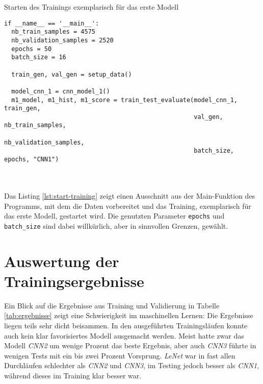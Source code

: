 \begin{listing} [ht]
	\caption{Starten des Trainings exemplarisch für das erste Modell}
	\label{lst:start-training}
	\begin{verbatim}
if __name__ == '__main__':
  nb_train_samples = 4575
  nb_validation_samples = 2520
  epochs = 50
  batch_size = 16

  train_gen, val_gen = setup_data()

  model_cnn_1 = cnn_model_1()
  m1_model, m1_hist, m1_score = train_test_evaluate(model_cnn_1, train_gen,
                                                    val_gen, nb_train_samples,
                                                    nb_validation_samples,
                                                    batch_size, epochs, "CNN1")
	\end{verbatim}
\end{listing} \ \\
\\
Das Listing \ref{lst:start-training} zeigt einen Ausschnitt aus der Main-Funktion des Programms, mit dem die Daten vorbereitet und das Training, exemplarisch für das erste Modell, gestartet wird. Die genutzten Parameter \texttt{epochs} und \texttt{batch\_size} sind dabei willkürlich, aber in sinnvollen Grenzen, gewählt.

\section{Auswertung der Trainingsergebnisse}
Ein Blick auf die Ergebnisse aus Training und Validierung in Tabelle \ref{tab:ergebnisse} zeigt eine Schwierigkeit im maschinellen Lernen: Die Ergebnisse liegen teils sehr dicht beisammen. In den ausgeführten Trainingsläufen konnte auch kein klar favorisiertes Modell ausgemacht werden. Meist hatte zwar das Modell \textit{CNN2} um wenige Prozent das beste Ergebnis, aber auch \textit{CNN3} führte in wenigen Tests mit ein bis zwei Prozent Vorsprung. \textit{LeNet} war in fast allen Durchläufen schlechter als \textit{CNN2} und \textit{CNN3}, im Testing jedoch besser als \textit{CNN1}, während dieses im Training klar besser war.

